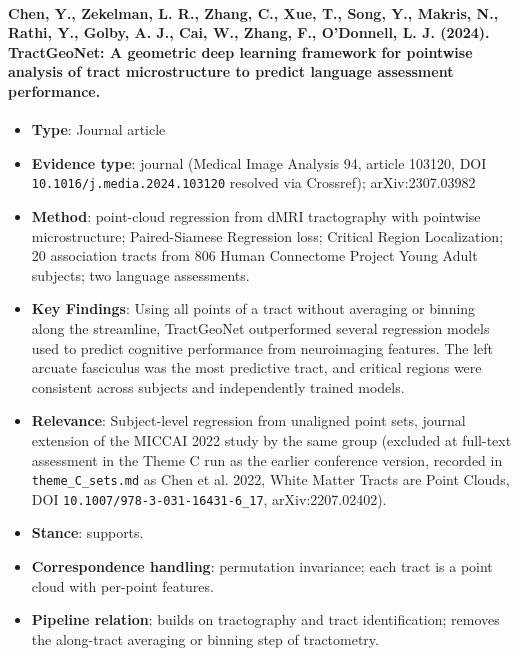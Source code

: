 \documentclass[journal,onecolumn]{IEEEtran}
\begin{document}
\paragraph{Chen, Y., Zekelman, L. R., Zhang, C., Xue, T., Song, Y., Makris, N., Rathi, Y., Golby, A. J., Cai, W., Zhang, F., O'Donnell, L. J. (2024). TractGeoNet: A geometric deep learning framework for pointwise analysis of tract microstructure to predict language assessment performance.~\cite{Chen2024TractGeoNet}}\mbox{}

\begin{itemize}

\item{} \textbf{Type}: Journal article

\item{} \textbf{Evidence type}: journal (Medical Image Analysis 94, article 103120, DOI \nolinkurl{10.1016/j.media.2024.103120} resolved via Crossref); arXiv:2307.03982

\item{} \textbf{Method}: point-cloud regression from dMRI tractography with pointwise microstructure; Paired-Siamese Regression loss; Critical Region Localization; 20 association tracts from 806 Human Connectome Project Young Adult subjects; two language assessments.

\item{} \textbf{Key Findings}: Using all points of a tract without averaging or binning along the streamline, TractGeoNet outperformed several regression models used to predict cognitive performance from neuroimaging features. The left arcuate fasciculus was the most predictive tract, and critical regions were consistent across subjects and independently trained models.

\item{} \textbf{Relevance}: Subject-level regression from unaligned point sets, journal extension of the MICCAI 2022 study by the same group (excluded at full-text assessment in the Theme C run as the earlier conference version, recorded in \nolinkurl{theme_C_sets.md} as Chen et al. 2022, White Matter Tracts are Point Clouds, DOI \nolinkurl{10.1007/978-3-031-16431-6_17}, arXiv:2207.02402).

\item{} \textbf{Stance}: supports.

\item{} \textbf{Correspondence handling}: permutation invariance; each tract is a point cloud with per-point features.

\item{} \textbf{Pipeline relation}: builds on tractography and tract identification; removes the along-tract averaging or binning step of tractometry.


\end{itemize}
\end{document}
